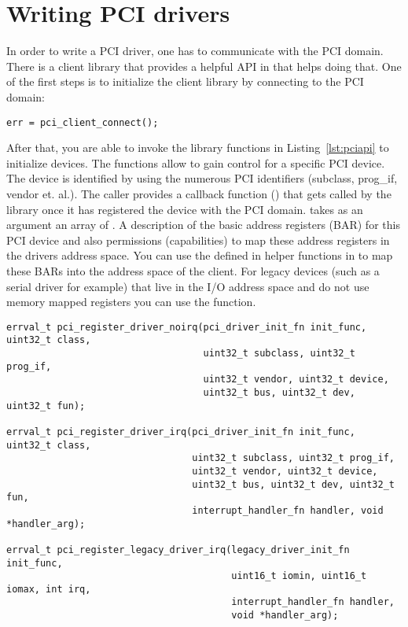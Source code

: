 \documentclass[a4paper,11pt,twoside]{report}
\begin{document}
\section{Writing PCI drivers}
\label{sec:pcidriverwriting}

In order to write a PCI driver, one has to communicate with the PCI domain.
There is a client library that provides a helpful API in  that
helps doing that. One of the first steps is to initialize the client library
by connecting to the PCI domain:

\begin{lstlisting}[caption={A client connects to the PCI subsystem.}, label={lst:pciconenct}]
err = pci_client_connect();
\end{lstlisting}

After that, you are able to invoke the library functions in
Listing~\ref{lst:pciapi} to initialize devices. The functions allow to gain
control for a specific PCI device. The device is identified by using the
numerous PCI identifiers (subclass, prog\_if, vendor et. al.). The caller
provides a callback function () that gets called by the
library once it has registered the device with the PCI domain.
 takes as an argument an array of . A description of the basic address registers (BAR) for this PCI
device and also permissions (capabilities) to map these address registers in
the drivers address space. You can use the defined in helper functions in
 to map these BARs into the address space of the
client. For legacy devices (such as a serial driver for example) that live in
the I/O address space and do not use memory mapped registers you can use the
 function.


\begin{lstlisting}[caption={A driver uses one of the following functions to register for PCI devices.}, label={lst:pciapi}]
errval_t pci_register_driver_noirq(pci_driver_init_fn init_func, uint32_t class,
                                   uint32_t subclass, uint32_t prog_if,
                                   uint32_t vendor, uint32_t device,
                                   uint32_t bus, uint32_t dev, uint32_t fun);

errval_t pci_register_driver_irq(pci_driver_init_fn init_func, uint32_t class,
                                 uint32_t subclass, uint32_t prog_if,
                                 uint32_t vendor, uint32_t device,
                                 uint32_t bus, uint32_t dev, uint32_t fun,
                                 interrupt_handler_fn handler, void *handler_arg);

errval_t pci_register_legacy_driver_irq(legacy_driver_init_fn init_func,
                                        uint16_t iomin, uint16_t iomax, int irq,
                                        interrupt_handler_fn handler,
                                        void *handler_arg);
\end{lstlisting}
\end{document}
